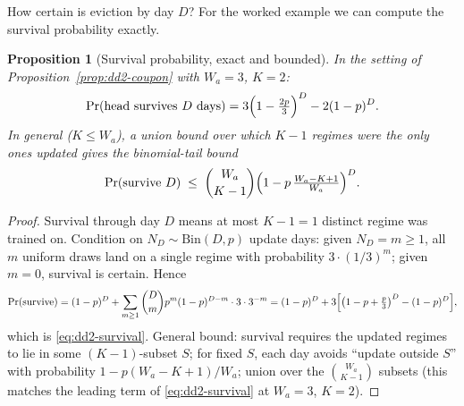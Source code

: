 \documentclass[11pt,a4paper]{article}
\theoremstyle{definition}
\theoremstyle{plain}
\newtheorem{proposition}{Proposition}[section]
\begin{document}
How certain is eviction by day $D$? For the worked example we can compute the
survival probability exactly.

\begin{proposition}[Survival probability, exact and bounded]
\label{prop:dd2-survival}
In the setting of Proposition~\ref{prop:dd2-coupon} with $W_a = 3$, $K = 2$:
\begin{equation}
\label{eq:dd2-survival}
\Pr(\text{head survives } D \text{ days})
= 3\Bigl(1 - \tfrac{2p}{3}\Bigr)^{D} - 2(1 - p)^{D}.
\end{equation}
In general ($K \le W_a$), a union bound over which $K-1$ regimes were the
only ones updated gives the binomial-tail bound
\[
\Pr(\text{survive } D)
\;\le\; \binom{W_a}{K-1}
\Bigl(1 - p\,\tfrac{W_a - K + 1}{W_a}\Bigr)^{D}.
\]
\end{proposition}

\begin{proof}
Survival through day $D$ means at most $K - 1 = 1$ distinct regime was
trained on. Condition on $N_D \sim \mathrm{Bin}(D, p)$ update days: given
$N_D = m \ge 1$, all $m$ uniform draws land on a single regime with
probability $3 \cdot (1/3)^m$; given $m = 0$, survival is certain. Hence
\[
\Pr(\text{survive})
= (1-p)^D + \sum_{m \ge 1} \binom{D}{m} p^m (1-p)^{D-m} \cdot 3 \cdot 3^{-m}
= (1-p)^D + 3\Bigl[\bigl(1 - p + \tfrac{p}{3}\bigr)^{D} - (1-p)^D\Bigr],
\]
which is \eqref{eq:dd2-survival}. General bound: survival requires the
updated regimes to lie in some $(K-1)$-subset $S$; for fixed $S$, each day
avoids ``update outside $S$'' with probability $1 - p(W_a - K + 1)/W_a$;
union over the $\binom{W_a}{K-1}$ subsets (this matches the leading term of
\eqref{eq:dd2-survival} at $W_a = 3$, $K = 2$).
\end{proof}
\end{document}
